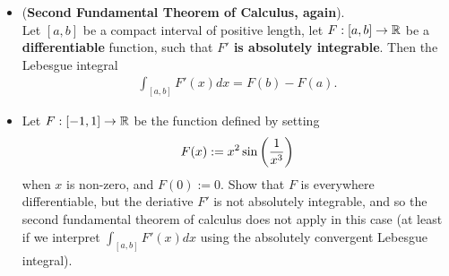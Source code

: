 \documentclass[11pt]{article}
\begin{document}
\begin{itemize}
\item \begin{theorem} (\textbf{Second Fundamental Theorem of Calculus, again}).\\
Let $[a, b]$ be a compact interval of positive length, let $F: [a, b] \rightarrow {\mathbb R}$ be a \textbf{differentiable} function, such that \textbf{$F'$ is absolutely integrable}. Then the Lebesgue integral 
\begin{align*}
\int_{[a, b]}F'(x) dx = F(b) - F(a).
\end{align*}
\end{theorem}

\item \begin{exercise}
Let $F: [-1, 1] \rightarrow {\mathbb R}$ be the function defined by setting 
\begin{align*}
F(x) := x^2 \sin\left(\frac{1}{x^3}\right) 
\end{align*} when $x$ is non-zero, and $F(0) := 0$. Show that $F$ is everywhere differentiable, but the deriative $F'$ is not absolutely integrable, and so the second fundamental theorem of calculus does not apply in this case (at least if we interpret $\int_{[a,b]} F'(x) dx$ using the absolutely convergent Lebesgue integral). 
\end{exercise}

\end{itemize}
\newpage


\end{document}
